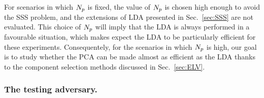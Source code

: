 For scenarios in which $N_p$ is fixed, the value of $N_p$ is chosen high enough to avoid the SSS problem, and the extensions of LDA presented in Sec.~\ref{sec:SSS} are not evaluated.
 This choice of $N_p$ will imply that the LDA is always performed in a favourable situation, which makes expect the LDA to be particularly efficient for these experiments. Consequentely, for the scenarios in which $N_p$ is high, our goal is to study whether the PCA can be made almost as efficient as the LDA thanks to the component selection methods discussed in Sec.~\ref{sec:ELV}. 



\subsubsection{The testing adversary.}  


